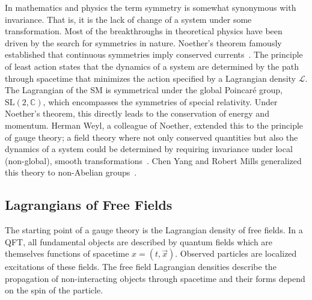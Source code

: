 In mathematics and physics the term symmetry is somewhat synonymous with invariance.
That is, it is the lack of change of a system under some transformation.
Most of the breakthroughs in theoretical physics have been driven by the search for symmetries in nature.
Noether's theorem famously established that continuous symmetries imply conserved currents~\cite{Noether1918}.
The principle of least action states that the dynamics of a system are determined by the path through spacetime that minimizes the action specified by a Lagrangian density $\mathcal{L}$.
The Lagrangian of the SM is symmetrical under the global Poincaré group, $\text{SL}(2, \mathbb{C})$, which encompasses the symmetries of special relativity.
Under Noether's theorem, this directly leads to the conservation of energy and momentum.
Herman Weyl, a colleague of Noether, extended this to the principle of gauge theory; a field theory where not only conserved quantities but also the dynamics of a system could be determined by requiring invariance under local (non-global), smooth transformations~\cite{GaugeSym}.
Chen Yang and Robert Mills generalized this theory to non-Abelian groups~\cite{YangMills}.

\subsection{Lagrangians of Free Fields}

The starting point of a gauge theory is the Lagrangian density of free fields.
In a QFT, all fundamental objects are described by quantum fields which are themselves functions of spacetime $x = (t, \vec{x})$.
Observed particles are localized excitations of these fields.
The free field Lagrangian densities describe the propagation of non-interacting objects through spacetime and their forms depend on the spin of the particle.

